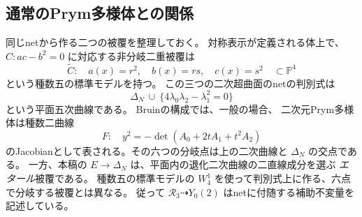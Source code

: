 \subsection{通常のPrym多様体との関係}
\label{subsec:classical-prym-context-v27}

同じnetから作る二つの被覆を整理しておく。
対称表示が定義される体上で、$C:ac-b^2=0$ に対応する非分岐二重被覆は
\[
 \widetilde C:\quad a(x)=r^2,\quad b(x)=rs,\quad c(x)=s^2
 \quad\subset\mathbb P^4
\]
という種数五の標準モデルを持つ。
この三つの二次超曲面のnetの判別式は
\[
 \Delta_N\ \cup\ \{4\lambda_0\lambda_2-\lambda_1^2=0\}
\]
という平面五次曲線である。
Bruinの構成\cite[Theorem 5.1, case 4]{BruinPrymGenusThree}では、一般の場合、
二次元Prym多様体は種数二曲線
\[
 F:\quad y^2=-\det(A_0+2tA_1+t^2A_2)
\]
のJacobianとして表される。その六つの分岐点は上の二次曲線と $\Delta_N$ の交点である。
一方、本稿の $E\to\Delta_N$ は、平面内の退化二次曲線の二直線成分を選ぶ
\emph{エタール}被覆である。
種数五の標準モデルの $W^1_4$ を使って判別式上に作る、六点で分岐する被覆とは異なる。
従って $\mathcal R_3\dashrightarrow Y_0(2)$ はnetに付随する補助不変量を記述している。
